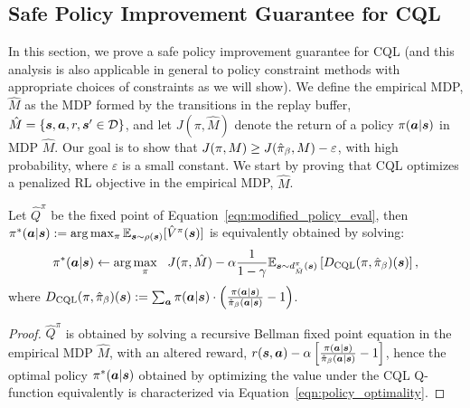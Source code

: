 \subsection{Safe Policy Improvement Guarantee for CQL}
\label{app:safe_pi}
In this section, we prove a safe policy improvement guarantee for CQL (and this analysis is also applicable in general to policy constraint methods with appropriate choices of constraints as we will show). We define the empirical MDP, $\hat{M}$ as the MDP formed by the transitions in the replay buffer, $\hat{M} = \{\boldsymbol{s}, \boldsymbol{a}, r, \boldsymbol{s}' \in \mathcal{D} \}$, and let $J(\pi, \hat{M})$ denote the return of a policy $\pi(\boldsymbol{a}|\boldsymbol{s})$ in MDP $\hat{M}$. Our goal is to show that $J(\pi, M) \geq J(\hat{\pi}_\beta, M) - \varepsilon$, with high probability, where $\varepsilon$ is a small constant. We start by proving that CQL optimizes a penalized RL objective in the empirical MDP, $\hat{M}$.

\begin{lemma}
Let $\hat{Q}^\pi$ be the fixed point of Equation~\ref{eqn:modified_policy_eval}, then $\pi^*(\boldsymbol{a}|\boldsymbol{s}) := \arg\max_{\pi} \mathbb{E}_{\boldsymbol{s} \sim \rho(\boldsymbol{s})}[\hat{V}^\pi(\boldsymbol{s})]$ is equivalently obtained by solving:
\begin{equation}
\label{eqn:policy_optimality}
    \pi^*(\boldsymbol{a}|\boldsymbol{s}) \leftarrow \arg \max_{\pi}~~ J(\pi, \hat{M}) - \alpha \frac{1}{1 - \gamma} \mathbb{E}_{\boldsymbol{s} \sim d^\pi_{\hat{M}}(\boldsymbol{s})}\left[D_{\text{CQL}}(\pi, \hat{\pi}_\beta)(\boldsymbol{s}) \right],
\end{equation}
where $D_{\text{CQL}}(\pi, \hat{\pi}_\beta)(\boldsymbol{s}) := \sum_{\boldsymbol{a}} \pi(\boldsymbol{a}|\boldsymbol{s}) \cdot \left(\frac{\pi(\boldsymbol{a}|\boldsymbol{s})}{\hat{\pi}_\beta(\boldsymbol{a}|\boldsymbol{s})} - 1 \right)$.
\end{lemma}
\begin{proof}
$\hat{Q}^\pi$ is obtained by solving a recursive Bellman fixed point equation in the empirical MDP $\hat{M}$, with an altered reward, $r(\boldsymbol{s}, \boldsymbol{a}) - \alpha \left[ \frac{\pi(\boldsymbol{a}|\boldsymbol{s})}{\hat{\pi}_\beta(\boldsymbol{a}|\boldsymbol{s})} - 1 \right]$, hence the optimal policy $\pi^*(\boldsymbol{a}|\boldsymbol{s})$ obtained by optimizing the value under the CQL Q-function equivalently is characterized via Equation~\ref{eqn:policy_optimality}.
\end{proof}


